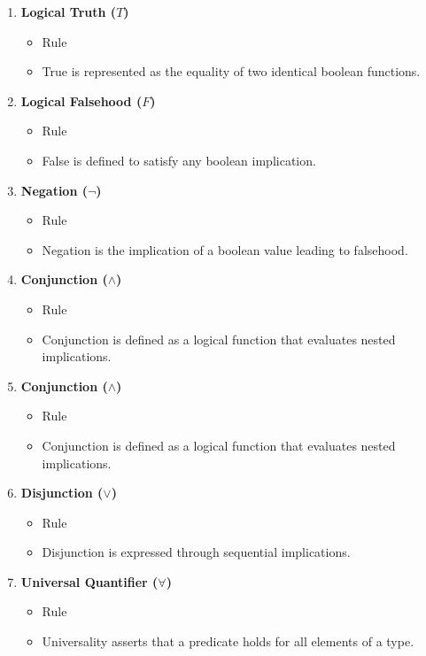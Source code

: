 \begin{enumerate}
    \item \textbf{Logical Truth ($T$)}
    \begin{itemize}
        \item Rule
        \item True is represented as the equality of two identical boolean functions.
    \end{itemize}

    \item \textbf{Logical Falsehood ($F$)}
    \begin{itemize}
        \item Rule
        \item False is defined to satisfy any boolean implication.
    \end{itemize}

    \item \textbf{Negation ($\neg$)}
    \begin{itemize}
        \item Rule
        \item Negation is the implication of a boolean value leading to falsehood.
    \end{itemize}

    \item \textbf{Conjunction ($\wedge$)}
    \begin{itemize}
        \item Rule
        \item Conjunction is defined as a logical function that evaluates nested implications.
    \end{itemize}

    \item \textbf{Conjunction ($\wedge$)}
    \begin{itemize}
        \item Rule
        \item Conjunction is defined as a logical function that evaluates nested implications.
    \end{itemize}

    \item \textbf{Disjunction ($\vee$)}
    \begin{itemize}
        \item Rule
        \item Disjunction is expressed through sequential implications.
    \end{itemize}

    \item \textbf{Universal Quantifier ($\forall$)}
    \begin{itemize}
        \item Rule
        \item Universality asserts that a predicate holds for all elements of a type.
    \end{itemize}


\end{enumerate}
